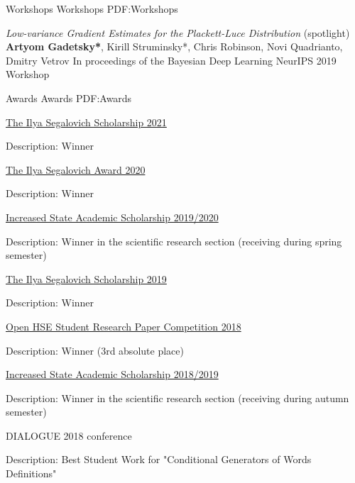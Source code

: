 \documentclass[letterpaper,MMMyyyy,nonstopmode]{simpleresumecv}
\begin{document}
\begin{Body}
\Gap
\SubSection
{Workshops}
{Workshops}
{PDF:Workshops}

\Item
\textit{Low-variance Gradient Estimates for the Plackett-Luce Distribution} (spotlight)
\Item
\textbf{Artyom Gadetsky*}, Kirill Struminsky*, Chris Robinson, Novi Quadrianto, Dmitry Vetrov
\Item
In proceedings of the Bayesian Deep Learning NeurIPS 2019 Workshop

\Section
{Awards}
{Awards}
{PDF:Awards}

\BulletItem
\href{https://cs.hse.ru/en/stipend/}{The Ilya Segalovich Scholarship 2021}
\begin{Detail}
\Item
Description: Winner
\end{Detail}

\BulletItem
\href{https://yandex.ru/scholarships}{The Ilya Segalovich Award 2020}
\begin{Detail}
\Item
Description: Winner
\end{Detail}

\BulletItem
\href{https://www.hse.ru/en/scholarships/academic_raised_demo}{Increased State Academic Scholarship 2019/2020}
\begin{Detail}
\Item
Description: Winner in the scientific research section (receiving during spring semester)
\end{Detail}

\BulletItem
\href{https://cs.hse.ru/en/stipend/}{The Ilya Segalovich Scholarship 2019}
\begin{Detail}
\Item
Description: Winner
\end{Detail}

\BulletItem
\href{https://nirs.hse.ru/nirs/}{Open HSE Student Research Paper Competition 2018}
\begin{Detail}
\Item
Description: Winner (3rd absolute place)
\end{Detail}

\BulletItem
\href{https://www.hse.ru/en/scholarships/academic_raised_demo}{Increased State Academic Scholarship 2018/2019}
\begin{Detail}
\Item
Description: Winner in the scientific research section (receiving during autumn semester)
\end{Detail}

\BulletItem
DIALOGUE 2018 conference
\begin{Detail}
\Item
Description: Best Student Work for "Conditional Generators of Words Definitions"
\end{Detail}


\end{Body}
\end{document}
